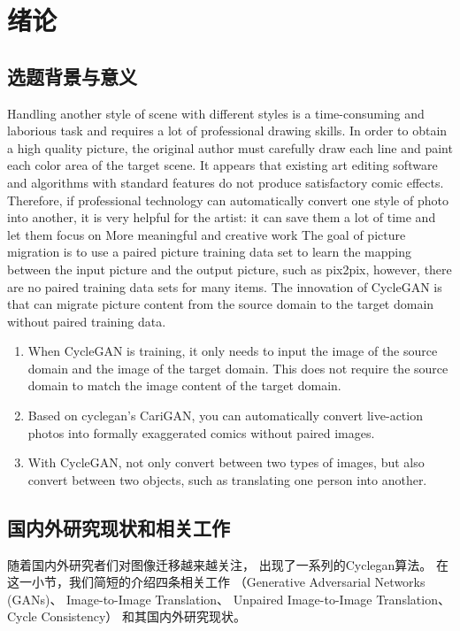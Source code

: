 \chapter{\heiti \label{ch1}绪论}
\section{\heiti 选题背景与意义}

Handling another style of scene with different styles 
is a time-consuming and laborious task and requires 
a lot of professional drawing skills. 
In order to obtain a high quality picture, 
the original author must carefully draw each line 
and paint each color area of the target scene. 
It appears that existing art editing software and 
algorithms with standard features do not produce 
satisfactory comic effects. Therefore, 
if professional technology can automatically convert 
one style of photo into another, 
it is very helpful for the artist: 
it can save them a lot of time and 
let them focus on More meaningful and creative work
The goal of picture migration is to use 
a paired picture training data set to learn 
the mapping between the input picture 
and the output picture, such as pix2pix\cite{pix2pix}, 
however, there are no paired training data sets for many items.
The innovation of CycleGAN\cite{Cyclegan} is that can migrate 
picture content from the source domain to the target domain 
without paired training data.

\begin{enumerate}[（1）] 
	\item When CycleGAN\cite{Cyclegan} is training, it only needs to 
	input the image of the source domain and the image of the target domain.
	This does not require the source domain to match the image content of the target domain.
	
	\item Based on cyclegan's CariGAN\cite{cGAN}, 
	you can automatically convert live-action photos 
	into formally exaggerated comics without paired images.
	
	\item With CycleGAN, not only convert between two types of images, 
	but also convert between two objects, 
	such as translating one person into another.
	
	
\end{enumerate}


\section{\heiti 国内外研究现状和相关工作}
随着国内外研究者们对图像迁移越来越关注，
出现了一系列的Cyclegan算法。
在这一小节，我们简短的介绍四条相关工作 
（Generative Adversarial Networks (GANs)、
Image-to-Image Translation、
Unpaired Image-to-Image Translation、
Cycle Consistency）
和其国内外研究现状。

